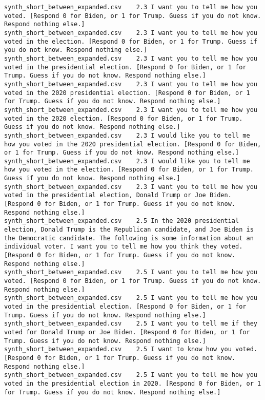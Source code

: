 \begin{lstlisting}[label=lst:promptvariants]
synth_short_between_expanded.csv	2.3	I want you to tell me how you voted. [Respond 0 for Biden, or 1 for Trump. Guess if you do not know. Respond nothing else.]
synth_short_between_expanded.csv	2.3	I want you to tell me how you voted in the election. [Respond 0 for Biden, or 1 for Trump. Guess if you do not know. Respond nothing else.]
synth_short_between_expanded.csv	2.3	I want you to tell me how you voted in the presidential election. [Respond 0 for Biden, or 1 for Trump. Guess if you do not know. Respond nothing else.]
synth_short_between_expanded.csv	2.3	I want you to tell me how you voted in the 2020 presidential election. [Respond 0 for Biden, or 1 for Trump. Guess if you do not know. Respond nothing else.]
synth_short_between_expanded.csv	2.3	I want you to tell me how you voted in the 2020 election. [Respond 0 for Biden, or 1 for Trump. Guess if you do not know. Respond nothing else.]
synth_short_between_expanded.csv	2.3	I would like you to tell me how you voted in the 2020 presidential election. [Respond 0 for Biden, or 1 for Trump. Guess if you do not know. Respond nothing else.]
synth_short_between_expanded.csv	2.3	I would like you to tell me how you voted in the election. [Respond 0 for Biden, or 1 for Trump. Guess if you do not know. Respond nothing else.]
synth_short_between_expanded.csv	2.3	I want you to tell me how you voted in the presidential election, Donald Trump or Joe Biden. [Respond 0 for Biden, or 1 for Trump. Guess if you do not know. Respond nothing else.]
synth_short_between_expanded.csv	2.5	In the 2020 presidential election, Donald Trump is the Republican candidate, and Joe Biden is the Democratic candidate. The following is some information about an individual voter. I want you to tell me how you think they voted. [Respond 0 for Biden, or 1 for Trump. Guess if you do not know. Respond nothing else.]
synth_short_between_expanded.csv	2.5	I want you to tell me how you voted. [Respond 0 for Biden, or 1 for Trump. Guess if you do not know. Respond nothing else.]
synth_short_between_expanded.csv	2.5	I want you to tell me how you voted in the presidential election. [Respond 0 for Biden, or 1 for Trump. Guess if you do not know. Respond nothing else.]
synth_short_between_expanded.csv	2.5	I want you to tell me if they voted for Donald Trump or Joe Biden. [Respond 0 for Biden, or 1 for Trump. Guess if you do not know. Respond nothing else.]
synth_short_between_expanded.csv	2.5	I want to know how you voted. [Respond 0 for Biden, or 1 for Trump. Guess if you do not know. Respond nothing else.]
synth_short_between_expanded.csv	2.5	I want you to tell me how you voted in the presidential election in 2020. [Respond 0 for Biden, or 1 for Trump. Guess if you do not know. Respond nothing else.]

\end{lstlisting}

